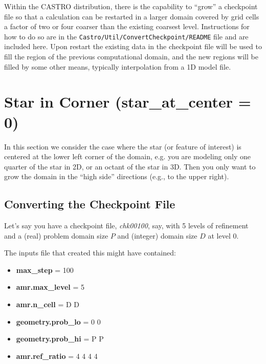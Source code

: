 
Within the CASTRO distribution, there is the capability to ``grow'' a
checkpoint file so that a calculation can be restarted in a larger
domain covered by grid cells a factor of two or four coarser than the
existing coarsest level.  Instructions for how to do so are in the
{\tt Castro/Util/ConvertCheckpoint/README} file and are included here.
Upon restart the existing data in the checkpoint file will be used to
fill the region of the previous computational domain, and the new
regions will be filled by some other means, typically interpolation
from a 1D model file.

\section{Star in Corner ({\bf star\_at\_center = 0}) }

In this section we consider the case where the star (or feature of interest) 
is centered at the lower left corner of the domain, e.g. you are modeling only one 
quarter of the star in 2D, or an octant of the star in 3D.  Then you only want
to grow the domain in the ``high side'' directions (e.g., to the upper right).

\subsection{Converting the Checkpoint File}

Let's say you have a checkpoint file, {\em chk00100},  say, with 5 levels of refinement 
and a (real) problem domain size $P$ and (integer) domain size $D$ at level 0.  

The inputs file that created this might have contained:

\begin{itemize}

\item {\bf max\_step}      = 100

\item {\bf amr.max\_level} = 5

\item {\bf amr.n\_cell}    = D D

\item {\bf geometry.prob\_lo} = 0 0

\item {\bf geometry.prob\_hi} = P P

\item {\bf amr.ref\_ratio}    = 4 4 4 4

\end{itemize}

